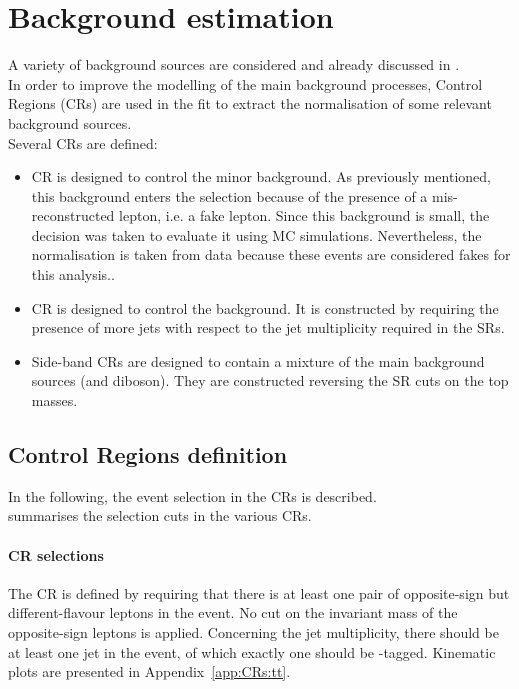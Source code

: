 \section{Background estimation}
\label{sec:background_all}
A variety of background sources are considered and already discussed in .\\
In order to improve the modelling of the main background processes, Control Regions (CRs) are used in the fit to extract the normalisation of some relevant background sources.\\
Several CRs are defined:
\begin{itemize}
	\item \ttbar CR is designed to control the minor \ttbar
	background. As previously mentioned, this background enters the
	selection because of the presence of a mis-reconstructed lepton,
	i.e. a fake lepton. Since this background is small, the decision was
	taken to evaluate it using MC simulations. Nevertheless, the normalisation is
	taken from data because these events are considered fakes for this analysis.. 
	\item \ttZ CR is designed to control the \ttZ
	background. It is constructed by requiring the presence of more jets
	with respect to the jet multiplicity required in the SRs.
	\item Side-band CRs are designed to contain a mixture
	of the main background sources (\ttZ and diboson). They are
	constructed reversing the SR cuts on the top masses.
\end{itemize}

\subsection {Control Regions definition}
\label{sec:bkg:sel}
In the following, the event selection in the CRs is described.\\
 summarises the selection cuts in the various CRs.
\paragraph{\ttbar CR selections}
The \ttbar CR is defined by requiring that there is at least one pair
of opposite-sign but different-flavour leptons in the
event. No cut on the invariant mass of the opposite-sign
leptons is applied. Concerning the jet multiplicity, there should be
at least one jet in the event, of which exactly one should be
\Pqb-tagged. Kinematic plots are presented in Appendix~\ref{app:CRs:tt}.


